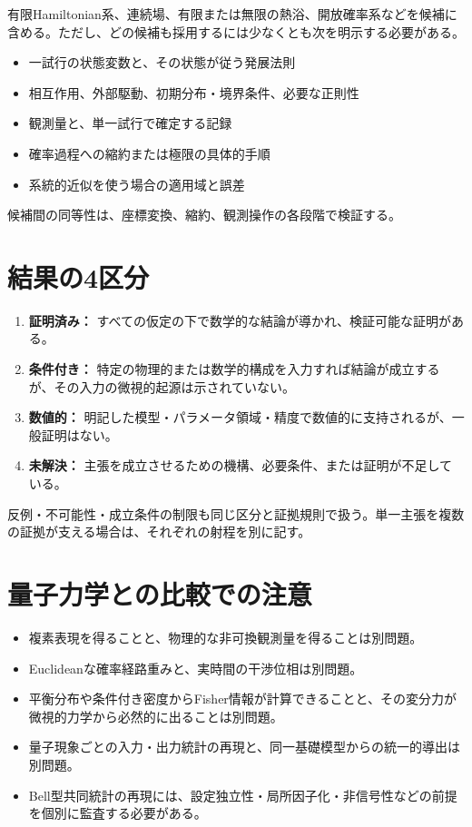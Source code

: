 \documentclass[11pt,a4paper,openany]{report}
\numberwithin{equation}{chapter}
\theoremstyle{definition}
\theoremstyle{remark}
\newcommand{\tightlist}{\setlength{\itemsep}{0pt}\setlength{\parskip}{0pt}}
\begin{document}
有限Hamiltonian系、連続場、有限または無限の熱浴、開放確率系などを候補に含める。ただし、どの候補も採用するには少なくとも次を明示する必要がある。

\begin{itemize}
\tightlist
\item
  一試行の状態変数と、その状態が従う発展法則
\item
  相互作用、外部駆動、初期分布・境界条件、必要な正則性
\item
  観測量と、単一試行で確定する記録
\item
  確率過程への縮約または極限の具体的手順
\item
  系統的近似を使う場合の適用域と誤差
\end{itemize}

候補間の同等性は、座標変換、縮約、観測操作の各段階で検証する。

\section{結果の4区分}\label{ux7d50ux679cux306e4ux533aux5206}

\begin{enumerate}
\def\labelenumi{\arabic{enumi}.}
\tightlist
\item
  \textbf{証明済み：} すべての仮定の下で数学的な結論が導かれ、検証可能な証明がある。
\item
  \textbf{条件付き：} 特定の物理的または数学的構成を入力すれば結論が成立するが、その入力の微視的起源は示されていない。
\item
  \textbf{数値的：} 明記した模型・パラメータ領域・精度で数値的に支持されるが、一般証明はない。
\item
  \textbf{未解決：} 主張を成立させるための機構、必要条件、または証明が不足している。
\end{enumerate}

反例・不可能性・成立条件の制限も同じ区分と証拠規則で扱う。単一主張を複数の証拠が支える場合は、それぞれの射程を別に記す。

\section{量子力学との比較での注意}\label{ux91cfux5b50ux529bux5b66ux3068ux306eux6bd4ux8f03ux3067ux306eux6ce8ux610f}

\begin{itemize}
\tightlist
\item
  複素表現を得ることと、物理的な非可換観測量を得ることは別問題。
\item
  Euclideanな確率経路重みと、実時間の干渉位相は別問題。
\item
  平衡分布や条件付き密度からFisher情報が計算できることと、その変分力が微視的力学から必然的に出ることは別問題。
\item
  量子現象ごとの入力・出力統計の再現と、同一基礎模型からの統一的導出は別問題。
\item
  Bell型共同統計の再現には、設定独立性・局所因子化・非信号性などの前提を個別に監査する必要がある。
\end{itemize}
\end{document}

